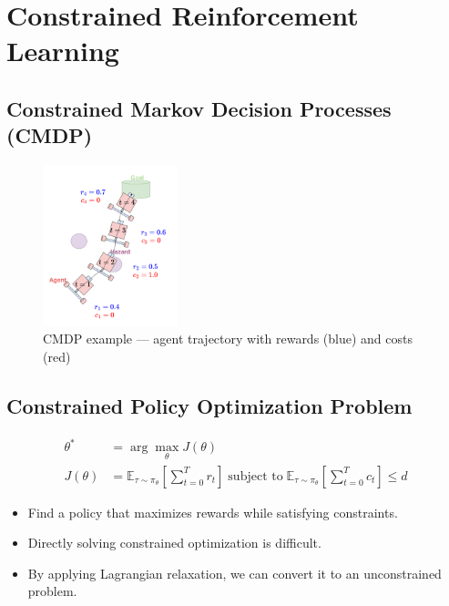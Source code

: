 \documentclass[8pt, aspectratio=169]{beamer} %
\begin{document}
\section{Constrained Reinforcement Learning}


\subsection{Constrained Markov Decision Processes (CMDP)}

\begin{frame}{\insertsubsectionhead}
  \begin{figure}
    \includegraphics[width=0.35\textwidth]{figures/constrained-rl1.pdf}
    \caption{CMDP example — agent trajectory with rewards (blue) and costs (red)}
  \end{figure}
\end{frame}


\subsection{Constrained Policy Optimization Problem}

\begin{frame}{\insertsubsectionhead}

  \begin{equation}
    \begin{aligned}
      \theta^* &= \arg\max_\theta J(\theta) \\
      J(\theta) &= \mathbb{E}_{\tau \sim \pi_\theta} \left[ \sum^T_{t = 0} r_t \right] \; \text{subject to} \; \mathbb{E}_{\tau \sim \pi_\theta} \left[ \sum^T_{t = 0} c_t \right] \leq d
    \end{aligned}
  \end{equation}

  \vspace{0.5cm}

  \begin{itemize}
    \item <2-> Find a policy that maximizes rewards while satisfying constraints.
    \item <3-> Directly solving constrained optimization is difficult.
    \item <4-> By applying Lagrangian relaxation, we can convert it to an unconstrained problem.
  \end{itemize}

\end{frame}
\end{document}
